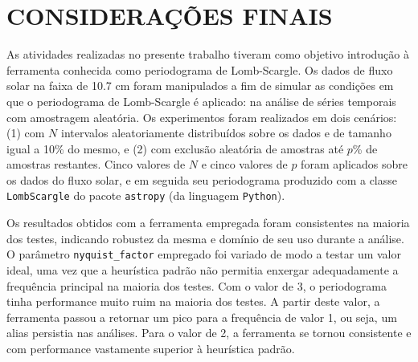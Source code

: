 \chapter{CONSIDERAÇÕES FINAIS}

As atividades realizadas no presente trabalho tiveram como objetivo introdução à ferramenta conhecida como periodograma de Lomb-Scargle. Os dados de fluxo solar na faixa de 10.7 cm foram manipulados a fim de simular as condições em que o periodograma de Lomb-Scargle é aplicado: na análise de séries temporais com amostragem aleatória. Os experimentos foram realizados em dois cenários: (1) com $N$ intervalos aleatoriamente distribuídos sobre os dados e de tamanho igual a 10\% do mesmo, e (2) com exclusão aleatória de amostras até $p$\% de amostras restantes. Cinco valores de $N$ e cinco valores de $p$ foram aplicados sobre os dados do fluxo solar, e em seguida seu periodograma produzido com a classe \texttt{LombScargle} do pacote \texttt{astropy} (da linguagem \texttt{Python}).

Os resultados obtidos com a ferramenta empregada foram consistentes na maioria dos testes, indicando robustez da mesma e domínio de seu uso durante a análise. O parâmetro \texttt{nyquist\_factor} empregado foi variado de modo a testar um valor ideal, uma vez que a heurística padrão não permitia enxergar adequadamente a frequência principal na maioria dos testes. Com o valor de 3, o periodograma tinha performance muito ruim na maioria dos testes. A partir deste valor, a ferramenta passou a retornar um pico para a frequência de valor 1, ou seja, um alias persistia nas análises. Para o valor de 2, a ferramenta se tornou consistente e com performance vastamente superior à heurística padrão.


